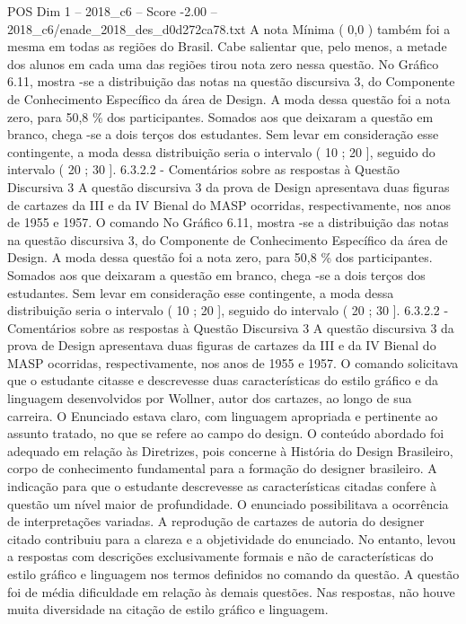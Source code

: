 \begin{textsample}{POS Dim 1 – 2018\_c6 – Score -2.00 – 2018\_c6/enade\_2018\_des\_d0d272ca78.txt}
A nota Mínima ( 0,0 ) também foi a mesma em todas as regiões do Brasil.
Cabe salientar que, pelo menos, a metade dos alunos em cada uma das regiões tirou nota zero nessa questão.
No Gráfico 6.11, mostra -se a distribuição das notas na questão discursiva 3, do Componente de Conhecimento Específico da área de Design.
A moda dessa questão foi a nota zero, para 50,8 \% dos participantes.
Somados aos que deixaram a questão em branco, chega -se a dois terços dos estudantes.
Sem levar em consideração esse contingente, a moda dessa distribuição seria o intervalo ( 10 ; 20 ], seguido do intervalo ( 20 ; 30 ]. 6.3.2.2 - Comentários sobre as respostas à Questão Discursiva 3 A questão discursiva 3 da prova de Design apresentava duas figuras de cartazes da III e da IV Bienal do MASP ocorridas, respectivamente, nos anos de 1955 e 1957.
O comando No Gráfico 6.11, mostra -se a distribuição das notas na questão discursiva 3, do Componente de Conhecimento Específico da área de Design.
A moda dessa questão foi a nota zero, para 50,8 \% dos participantes.
Somados aos que deixaram a questão em branco, chega -se a dois terços dos estudantes.
Sem levar em consideração esse contingente, a moda dessa distribuição seria o intervalo ( 10 ; 20 ], seguido do intervalo ( 20 ; 30 ]. 6.3.2.2 - Comentários sobre as respostas à Questão Discursiva 3 A questão discursiva 3 da prova de Design apresentava duas figuras de cartazes da III e da IV Bienal do MASP ocorridas, respectivamente, nos anos de 1955 e 1957.
O comando solicitava que o estudante citasse e descrevesse duas características do estilo gráfico e da linguagem desenvolvidos por Wollner, autor dos cartazes, ao longo de sua carreira.
O Enunciado estava claro, com linguagem apropriada e pertinente ao assunto tratado, no que se refere ao campo do design.
O conteúdo abordado foi adequado em relação às Diretrizes, pois concerne à História do Design Brasileiro, corpo de conhecimento fundamental para a formação do designer brasileiro.
A indicação para que o estudante descrevesse as características citadas confere à questão um nível maior de profundidade.
O enunciado possibilitava a ocorrência de interpretações variadas.
A reprodução de cartazes de autoria do designer citado contribuiu para a clareza e a objetividade do enunciado.
No entanto, levou a respostas com descrições exclusivamente formais e não de características do estilo gráfico e linguagem nos termos definidos no comando da questão.
A questão foi de média dificuldade em relação às demais questões.
Nas respostas, não houve muita diversidade na citação de estilo gráfico e linguagem.

\end{textsample}
